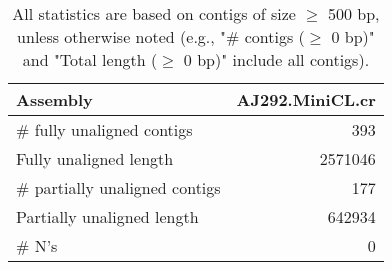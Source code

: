 \documentclass[12pt,a4paper]{article}
\begin{document}
\begin{table}[ht]
\begin{center}
\caption{All statistics are based on contigs of size $\geq$ 500 bp, unless otherwise noted (e.g., "\# contigs ($\geq$ 0 bp)" and "Total length ($\geq$ 0 bp)" include all contigs).}
\begin{tabular}{|l*{1}{|r}|}
\hline
Assembly & AJ292.MiniCL.cr \\ \hline
\# fully unaligned contigs & 393 \\ \hline
Fully unaligned length & 2571046 \\ \hline
\# partially unaligned contigs & 177 \\ \hline
Partially unaligned length & 642934 \\ \hline
\# N's & 0 \\ \hline
\end{tabular}
\end{center}
\end{table}
\end{document}
